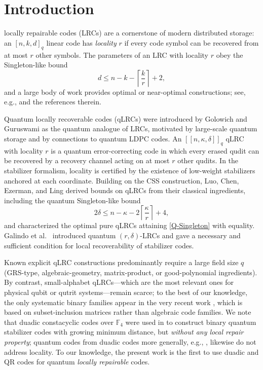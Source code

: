 \documentclass[journal,onecolumn]{IEEEtran}
\newcommand{\Ff}{{\mathbb F}}
\newcommand{\dsb}[1]{[\![#1]\!]}
\begin{document}
\IEEEpeerreviewmaketitle

\section{Introduction}

 locally repairable codes (LRCs) \cite{Gopalan2012} are a cornerstone of modern distributed storage: an $[n,k,d]_q$ linear code has \emph{locality} $r$ if every code symbol can be recovered from at most $r$ other symbols. The parameters of an LRC with locality $r$ obey the Singleton-like bound
\begin{equation}\label{C-Singleton}
d\le n-k-\left\lceil\frac{k}{r}\right\rceil+2,
\end{equation}
and a large body of work provides optimal or near-optimal constructions; see, e.g., \cite{Tamo2014,Jin2019,Chen2018,Luo2019} and the references therein.

Quantum locally recoverable codes (qLRCs) were introduced by Golowich and Guruswami \cite{Golowich2023} as the quantum analogue of LRCs, motivated by large-scale quantum storage and by connections to quantum LDPC codes. An $\dsb{n,\kappa,\delta}_q$ qLRC with locality $r$ is a quantum error-correcting code in which every erased qudit can be recovered by a recovery channel acting on at most $r$ other qudits. In the stabilizer formalism, locality is certified by the existence of low-weight stabilizers anchored at each coordinate. Building on the CSS construction, Luo, Chen, Ezerman, and Ling \cite{Luo2023} derived bounds on qLRCs from their classical ingredients, including the quantum Singleton-like bound
\begin{equation}\label{Q-Singleton}
2\delta\le n-\kappa-2\left\lceil\frac{\kappa}{r}\right\rceil+4,
\end{equation}
and characterized the optimal pure qLRCs attaining \eqref{Q-Singleton} with equality. Galindo et al.~\cite{Galindo2024} introduced quantum $(r,\delta)$-LRCs and gave a necessary and sufficient condition for local recoverability of stabilizer codes.

Known explicit qLRC constructions \cite{Golowich2023,Luo2023,Galindo2024,Sharma2024,Li2025,Rajpurohit2026} predominantly require a large field size $q$ (GRS-type, algebraic-geometry, matrix-product, or good-polynomial ingredients). By contrast, small-alphabet qLRCs---which are the most relevant ones for physical qubit or qutrit systems---remain scarce; to the best of our knowledge, the only systematic binary families appear in the very recent work \cite{Stylianou2026}, which is based on subset-inclusion matrices rather than algebraic code families. We note that duadic constacyclic codes over $\Ff_4$ were used in \cite{Dastbasteh2023} to construct binary quantum stabilizer codes with growing minimum distance, but \emph{without any local repair property}; quantum codes from duadic codes more generally, e.g., \cite{Aly2007}, likewise do not address locality. To our knowledge, the present work is the first to use duadic and QR codes for quantum \emph{locally repairable} codes.
\end{document}
